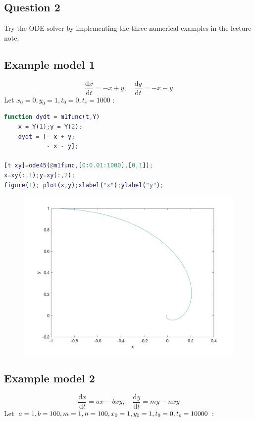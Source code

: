 \documentclass[12pt,a4paper]{article}
\newcommand{\dd}{\mathrm{d}}
\begin{document}
\begin{spacing}{1.5}
\section{Question 2}

Try the  ODE solver by implementing the three numerical examples in the lecture note.

\subsection{Example model 1}
\[
    \frac{\dd x}{\dd t} = - x + y, \quad
    \frac{\dd y}{\dd t} = - x - y
\]
Let $x_0=0, y_0=1, t_0=0, t_e=1000$ :
\begin{lstlisting}[language=matlab]
function dydt = m1func(t,Y)
    x = Y(1);y = Y(2);
    dydt = [- x + y;
            - x - y];

[t xy]=ode45(@m1func,[0:0.01:1000],[0,1]);
x=xy(:,1);y=xy(:,2);
figure(1); plot(x,y);xlabel("x");ylabel("y");
\end{lstlisting}
\begin{figure}[htbp]
	\centering
	\includegraphics[scale=0.25]{m1.png}	
\end{figure}

\subsection{Example model 2}
\[
    \frac{\dd x}{\dd t} = ax - bxy, \quad
    \frac{\dd y}{\dd t} = my - nxy
\]
Let $a=1,b=100,m=1,n=100,\\ x_0=1, y_0=1, t_0=0, t_e=10000$ :


\end{spacing}
\end{document}
